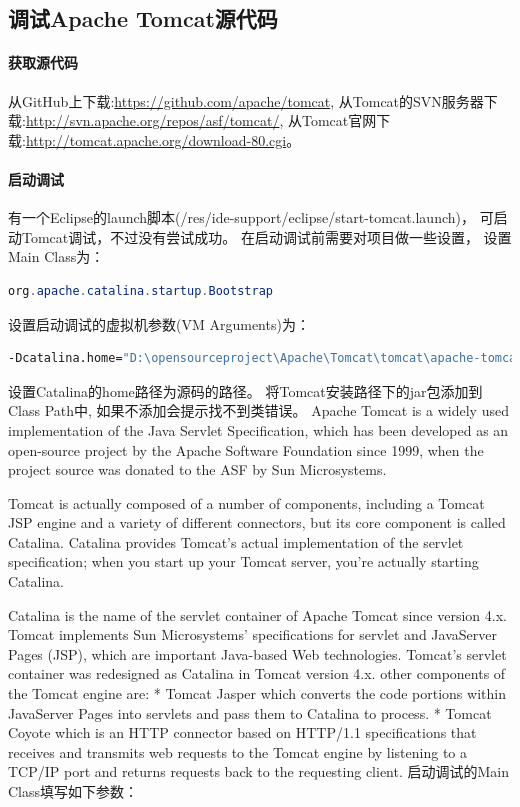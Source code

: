 \documentclass{book}
\begin{document}
\subsection{调试Apache Tomcat源代码}

\paragraph{获取源代码}

从GitHub上下载:\url{https://github.com/apache/tomcat},
从Tomcat的SVN服务器下载:\url{http://svn.apache.org/repos/asf/tomcat/},
从Tomcat官网下载:\url{http://tomcat.apache.org/download-80.cgi}。

\paragraph{启动调试}

有一个Eclipse的launch脚本(/res/ide-support/eclipse/start-tomcat.launch)，
可启动Tomcat调试，不过没有尝试成功。
在启动调试前需要对项目做一些设置，
设置Main Class为：

\begin{lstlisting}[language=Java]
org.apache.catalina.startup.Bootstrap
\end{lstlisting}

设置启动调试的虚拟机参数(VM Arguments)为：

\begin{lstlisting}[language=Bash]
-Dcatalina.home="D:\opensourceproject\Apache\Tomcat\tomcat\apache-tomcat-8.0.36-src\"
\end{lstlisting}

设置Catalina的home路径为源码的路径。
将Tomcat安装路径下的jar包添加到Class Path中,
如果不添加会提示找不到类错误。
Apache Tomcat is a widely used implementation of the Java Servlet Specification, 
which has been developed as an open-source project by the Apache Software Foundation since 1999, 
when the project source was donated to the ASF by Sun Microsystems.

Tomcat is actually composed of a number of components, 
including a Tomcat JSP engine and a variety of different connectors, but its core component is called Catalina. 
Catalina provides Tomcat's actual implementation of the servlet specification; 
when you start up your Tomcat server, you're actually starting Catalina.

Catalina is the name of the servlet container of Apache
Tomcat since version 4.x. Tomcat implements Sun
Microsystems' specifications for servlet and JavaServer
Pages (JSP), which are important Java-based Web technologies.
Tomcat's servlet container was redesigned as Catalina in
Tomcat version 4.x. 
other components of the Tomcat engine are:
* Tomcat Jasper which converts the code portions within
JavaServer Pages into servlets and pass them to Catalina to
process.
* Tomcat Coyote which is an HTTP connector based on
HTTP/1.1 specifications that receives and transmits web
requests to the Tomcat engine by listening to a TCP/IP port
and returns requests back to the requesting client.
启动调试的Main Class填写如下参数：
\end{document}
